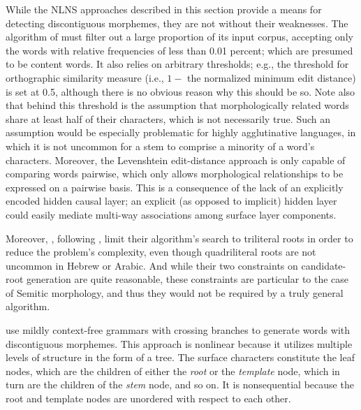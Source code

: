While the NLNS approaches described in this section provide a means for detecting discontiguous morphemes, they are not without their weaknesses. 
The algorithm of \cite{baroni-et-al:2002} must filter out a large proportion of its input corpus, accepting only the words with relative frequencies of less than 0.01 percent; which are presumed to be content words.
It also relies on arbitrary thresholds; e.g., the threshold for orthographic similarity measure (i.e., $1 - $ the normalized minimum edit distance) is set at 0.5, although there is no obvious reason why this should be so.
Note also that behind this threshold is the assumption that morphologically related words share at least half of their characters, which is not necessarily true. Such an assumption would be especially problematic for highly agglutinative languages, 
in which it is not uncommon for a stem to comprise a minority of a word's characters.
Moreover, the Levenshtein edit-distance approach is only capable of comparing words pairwise, which only allows morphological relationships to be expressed on a pairwise basis. This is a consequence of the lack of an explicitly encoded hidden causal layer; an explicit (as opposed to implicit) hidden layer could easily mediate multi-way associations among surface layer components.                                   

Moreover, \cite{rodrigues-and-cavar:2005}, following \cite{elghamry:2005}, limit their algorithm's search to triliteral roots in order to reduce the problem's complexity, even though quadriliteral roots are not uncommon in Hebrew or Arabic.
And while their two constraints on candidate-root generation are quite reasonable, these constraints are particular to the case of Semitic morphology, and thus they would not be required by a truly general algorithm.

\cite{botha:blunsom:13} use mildly context-free grammars 
with crossing branches to generate words with discontiguous morphemes. This approach
is nonlinear because it utilizes multiple levels of structure in the form of a tree.
The surface characters
constitute the leaf nodes, which are the children of either the \emph{root} 
or the \emph{template} node, which in turn are the children of the \emph{stem} 
node, and so on.  It is nonsequential because the root and template nodes are unordered with respect to
each other.

